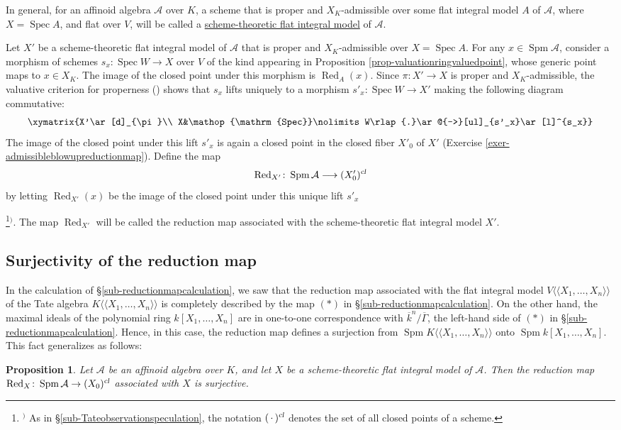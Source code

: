 \documentclass[a4paper,12pt, dvipdfmx]{jsbook}
\def\ovl#1{\overline{#1}}%
\def\Red{\mathop{\mathrm{Red}}\nolimits}
\def\cl{\mathop{\textsl{cl}}\nolimits}
\def\Spec{\mathop{\mathrm{Spec}}\nolimits}
\def\Spm{\mathop{\mathrm{Spm}}\nolimits}
\def\dl{\langle\!\langle}
\def\dr{\rangle\!\rangle}
\theoremstyle{plain}
\newtheorem{prop}[thm]{\bfseries Proposition}
\theoremstyle{definition}
\newcounter{chushaku}
\def\chu#1{\addtocounter{chushaku}{1}\footnote[\value{chushaku}]{${}^)$ #1}${}^)$}
\begin{document}
In general, for an affinoid algebra $\mathcal{A}$ over $K$, a scheme that is proper and $X_K$-admissible over some flat integral model $A$ of $\mathcal{A}$, where $X=\Spec A$, and flat over $V$, will be called a \underline{scheme-theoretic flat integral model} of $\mathcal{A}$.

Let $X'$ be a scheme-theoretic flat integral model of $\mathcal{A}$ that is proper and $X_K$-admissible over $X=\Spec A$.
For any $x\in\Spm\mathcal{A}$, consider a morphism of schemes $s_x\colon\Spec W\rightarrow X$ over $V$ of the kind appearing in Proposition \ref{prop-valuationringvaluedpoint}, whose generic point maps to $x\in X_K$.
The image of the closed point under this morphism is $\Red_A(x)$.
Since $\pi\colon X'\rightarrow X$ is proper and $X_K$-admissible, the valuative criterion for properness (\cite[Chap.\ II, Theorem 4.7]{Hart2}) shows that $s_x$ lifts uniquely to a morphism $s'_x\colon\Spec W\rightarrow X'$ making the following diagram commutative:
$$
\xymatrix{X'\ar[d]_{\pi}\\ X&\Spec W\rlap{.}\ar@{-->}[ul]_{s'_x}\ar[l]^{s_x}}
$$
The image of the closed point under this lift $s'_x$ is again a closed point in the closed fiber $X'_0$ of $X'$ (Exercise \ref{exer-admissibleblowupreductionmap}).
Define the map
$$
\Red_{X'}\colon\Spm\mathcal{A}\longrightarrow(X'_0)^{\cl}
$$
by letting $\Red_{X'}(x)$ be the image of the closed point under this unique lift $s'_x$\chu{As in \S\ref{sub-Tateobservationspeculation}, the notation $(\,\cdot\,)^{\cl}$ denotes the set of all closed points of a scheme.}.
The map $\Red_{X'}$ will be called the reduction map associated with the scheme-theoretic flat integral model $X'$.

\subsection{Surjectivity of the reduction map}\label{sub-reductionmapsurjectiveness}
In the calculation of \S\ref{sub-reductionmapcalculation}, we saw that the reduction map associated with the flat integral model $V\dl X_1,\ldots,X_n\dr$ of the Tate algebra $K\dl X_1,\ldots,X_n\dr$ is completely described by the map $(\ast)$ in \S\ref{sub-reductionmapcalculation}.
On the other hand, the maximal ideals of the polynomial ring $k[X_1,\ldots,X_n]$ are in one-to-one correspondence with $\ovl{k}^n/\ovl{\Gamma}$, the left-hand side of $(\ast)$ in \S\ref{sub-reductionmapcalculation}. Hence, in this case, the reduction map defines a surjection from $\Spm K\dl X_1,\ldots,X_n\dr$ onto $\Spm k[X_1,\ldots,X_n]$.
This fact generalizes as follows:
\begin{prop}\label{prop-reductionmapsurjectiveness}{\rm
Let $\mathcal{A}$ be an affinoid algebra over $K$, and let $X$ be a scheme-theoretic flat integral model of $\mathcal{A}$.
Then the reduction map $\Red_X\colon\Spm\mathcal{A}\rightarrow(X_0)^{\cl}$ associated with $X$ is surjective.}
\end{prop}
\end{document}
